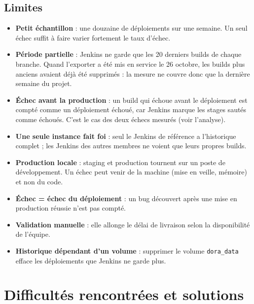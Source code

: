 \documentclass[11pt,a4paper]{report}
\begin{document}
\section{Limites}
\begin{itemize}
  \item \textbf{Petit échantillon} : une douzaine de déploiements sur une semaine. Un seul échec suffit à faire varier fortement le taux d'échec.
  \item \textbf{Période partielle} : Jenkins ne garde que les 20 derniers builds de chaque branche. Quand l'exporter a été mis en service le 26 octobre, les builds plus anciens avaient déjà été supprimés : la mesure ne couvre donc que la dernière semaine du projet.
  \item \textbf{Échec avant la production} : un build qui échoue avant le déploiement est compté comme un déploiement échoué, car Jenkins marque les stages sautés comme échoués. C'est le cas des deux échecs mesurés (voir l'analyse).
  \item \textbf{Une seule instance fait foi} : seul le Jenkins de référence a l'historique complet ; les Jenkins des autres membres ne voient que leurs propres builds.
  \item \textbf{Production locale} : staging et production tournent sur un poste de développement. Un échec peut venir de la machine (mise en veille, mémoire) et non du code.
  \item \textbf{Échec = échec du déploiement} : un bug découvert après une mise en production réussie n'est pas compté.
  \item \textbf{Validation manuelle} : elle allonge le délai de livraison selon la disponibilité de l'équipe.
  \item \textbf{Historique dépendant d'un volume} : supprimer le volume \texttt{dora\_data} efface les déploiements que Jenkins ne garde plus.
\end{itemize}

\chapter{Difficultés rencontrées et solutions}
\end{document}
